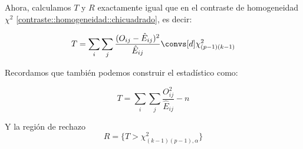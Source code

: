 Ahora, calculamos $T$ y $R$ exactamente igual que en el contraste de homogeneidad $\chi^2$ \ref{contraste::homogeneidad::chicuadrado}, es decir:

\[T = \sum_i \sum_j \frac{(O_{ij} - \hat{E}_{ij})^2}{\hat{E}_{ij}} \convs[d] \chi^2_{(p-1)(k-1)} \] 

Recordamos que también podemos construir el estadístico como:

\[T = \sum_{i}\sum_j \frac{O_{ij}^2}{\hat{E}_{ij}} - n\]

Y la región de rechazo \[R = \{T>\chi^2_{(k-1)(p-1),α}\}\]
